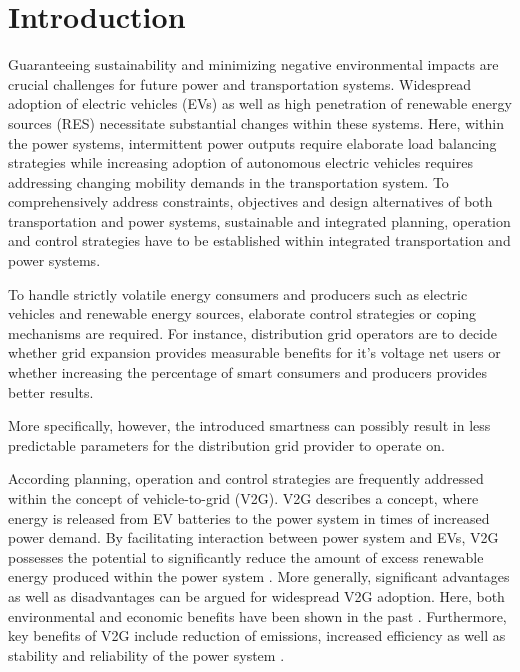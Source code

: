 \section{Introduction}

Guaranteeing sustainability and minimizing negative environmental impacts are crucial challenges for future power and transportation systems. Widespread adoption of electric vehicles (EVs) as well as high penetration of renewable energy sources (RES) necessitate substantial changes within these systems. Here, within the power systems, intermittent power outputs require elaborate load balancing strategies while increasing adoption of autonomous electric vehicles requires addressing changing mobility demands in the transportation system. To comprehensively address constraints, objectives and design alternatives of both transportation and power systems, sustainable and integrated planning, operation and control strategies have to be established within integrated transportation and power systems.

To handle strictly volatile energy consumers and producers such as electric vehicles and renewable energy sources, elaborate control strategies or coping mechanisms are required. For instance, distribution grid operators are to decide whether grid expansion provides measurable benefits for it's voltage net users or whether increasing the percentage of smart consumers and producers provides better results.

More specifically, however, the introduced smartness can possibly result in less predictable parameters for the distribution grid provider to operate on.


According planning, operation and control strategies are frequently addressed within the concept of vehicle-to-grid (V2G). V2G describes a concept, where energy is released from EV batteries to the power system in times of increased power demand.  By facilitating interaction between power system and EVs, V2G possesses the potential to significantly reduce the amount of excess renewable energy produced within the power system \cite{richardson2013electric}. More generally, significant advantages as well as disadvantages can be argued for widespread V2G adoption. Here, both environmental and economic benefits have been shown in the past \cite{faria2012sustainability, richardson2013electric, mwasilu2014electric}. Furthermore, key benefits of V2G include reduction of emissions, increased efficiency as well as stability and reliability of the power system \cite{yilmaz2013review}.

